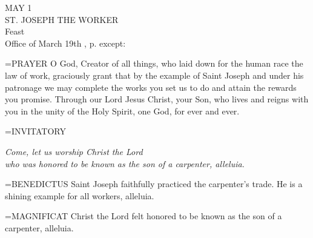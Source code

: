 \begin{center}\normalsize MAY 1\\
\footnotesize ST. JOSEPH THE WORKER\\
\footnotesize Feast\\
\footnotesize Office of March 19th , p.    except:\\
\end{center}

\hangindent=\parindent \small{PRAYER 
O God, Creator of all things,
who laid down for the human race the law of work,
graciously grant
that by the example of Saint Joseph and under his patronage
we may complete the works you set us to do
and attain the rewards you promise.
Through our Lord Jesus Christ, your Son,
who lives and reigns with you in the unity of the Holy Spirit,
one God, for ever and ever.\\}
 

\hangindent=\parindent \small{INVITATORY}
\begin{center}
\textit{Come, let us worship Christ the Lord\\}
\textit{who was honored to be known as the son of a carpenter, alleluia.\\}
\end{center}

\hangindent=\parindent \small{BENEDICTUS  Saint Joseph faithfully practiced the carpenter’s trade. He
is a shining example for all workers, alleluia.\\}
 
\hangindent=\parindent \small{MAGNIFICAT  Christ the Lord felt honored to be known as the son of
a carpenter, alleluia.\\}
 

